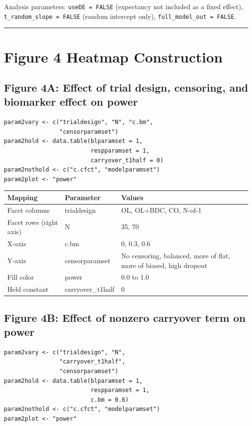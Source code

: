 \documentclass[11pt]{article}
\begin{document}
Analysis parameters: \texttt{useDE = FALSE} (expectancy not included
as a fixed effect), \texttt{t\_random\_slope = FALSE} (random intercept
only), \texttt{full\_model\_out = FALSE}.

\bigskip\noindent\rule{\textwidth}{0.4pt}\bigskip

\section{Figure 4 Heatmap Construction}

\subsection{Figure 4A: Effect of trial design, censoring, and
biomarker effect on power}

\begin{lstlisting}
param2vary <- c("trialdesign", "N", "c.bm",
                "censorparamset")
param2hold <- data.table(blparamset = 1,
                         respparamset = 1,
                         carryover_t1half = 0)
param2nothold <- c("c.cfct", "modelparamset")
param2plot <- "power"
\end{lstlisting}

\begin{table}[h]
\centering
\begin{tabular}{lll}
\toprule
Mapping & Parameter & Values \\
\midrule
Facet columns & trialdesign & OL, OL+BDC, CO, N-of-1 \\
Facet rows (right axis) & N & 35, 70 \\
X-axis & c.bm & 0, 0.3, 0.6 \\
Y-axis & censorparamset & No censoring, balanced, more of flat, more of biased, high dropout \\
Fill color & power & 0.0 to 1.0 \\
Held constant & carryover\_t1half & 0 \\
\bottomrule
\end{tabular}
\end{table}

\subsection{Figure 4B: Effect of nonzero carryover term on power}

\begin{lstlisting}
param2vary <- c("trialdesign", "N",
                "carryover_t1half",
                "censorparamset")
param2hold <- data.table(blparamset = 1,
                         respparamset = 1,
                         c.bm = 0.6)
param2nothold <- c("c.cfct", "modelparamset")
param2plot <- "power"
\end{lstlisting}
\end{document}
